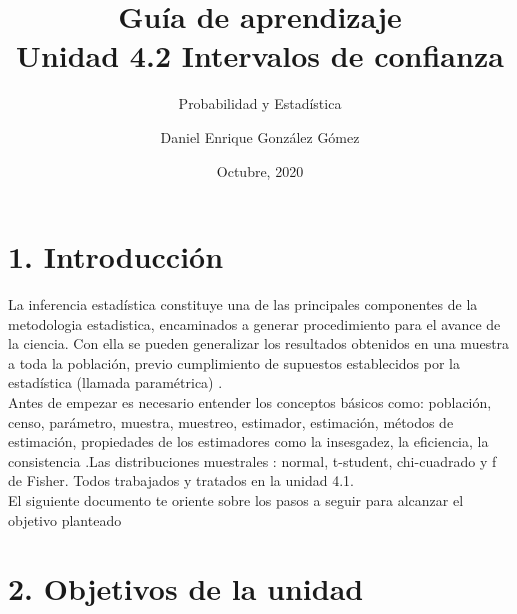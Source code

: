 \documentclass[base=hide,11pt]{elegantbook}
\title{Guía de  aprendizaje\\
	Unidad  4.2 Intervalos de confianza}
\subtitle{Probabilidad y Estadística}
\author{Daniel Enrique González Gómez}
\institute{Pontificia Universidad Javeriana Cali}
\date{Octubre, 2020}
\begin{document}

\maketitle

\frontmatter
%
\mainmatter

\section*{1. Introducción}

La inferencia estadística constituye una de las principales componentes de la metodologia estadistica, encaminados a generar procedimiento para el avance de la ciencia. Con ella se pueden generalizar los
resultados obtenidos en una muestra a toda la población, previo cumplimiento de supuestos establecidos por la estadística (llamada paramétrica) .\\

Antes de empezar es necesario entender los conceptos básicos como: población, censo, parámetro, muestra, muestreo, estimador, estimación, métodos de estimación, propiedades de los estimadores como la insesgadez, la eficiencia, la consistencia .Las distribuciones muestrales : normal, t-student, chi-cuadrado y f de Fisher. Todos trabajados y tratados en la unidad 4.1.\\

El siguiente documento te  oriente sobre los pasos a seguir para alcanzar el objetivo planteado

\section*{2. Objetivos de la unidad}
\end{document}
